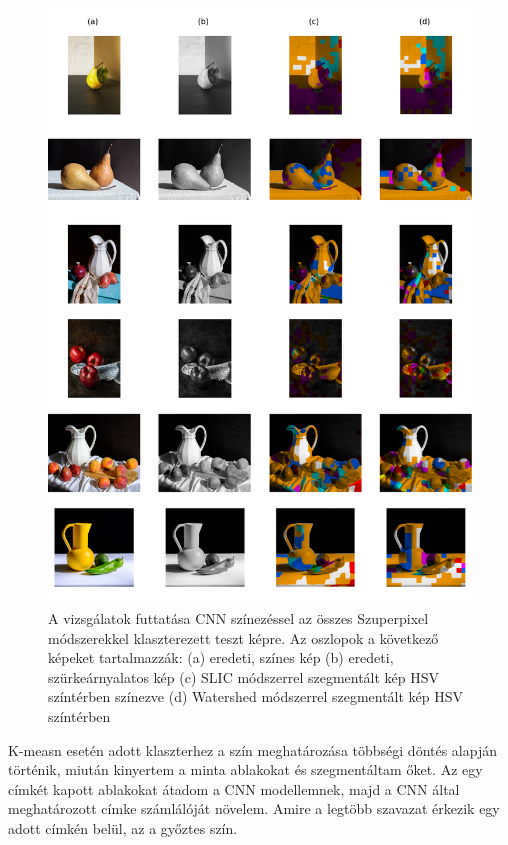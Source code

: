 \begin{figure}[h]
\centering
\includegraphics[scale=0.5]{images/result_all_superpixel.png}
\caption{A vizsgálatok futtatása CNN színezéssel az összes Szuperpixel módszerekkel klaszterezett teszt képre. Az oszlopok a következő képeket tartalmazzák: (a) eredeti, színes kép (b) eredeti, szürkeárnyalatos kép (c) SLIC módszerrel szegmentált kép HSV színtérben színezve (d) Watershed módszerrel szegmentált kép HSV színtérben}
\label{fig:result_all_superpixel}
\end{figure}

K-measn esetén adott klaszterhez a szín meghatározása többségi döntés alapján történik, miután kinyertem a minta ablakokat és szegmentáltam őket. Az egy címkét kapott ablakokat átadom a CNN modellemnek, majd a CNN által meghatározott címke számlálóját növelem. Amire a legtöbb szavazat érkezik egy adott címkén belül, az a győztes szín.

